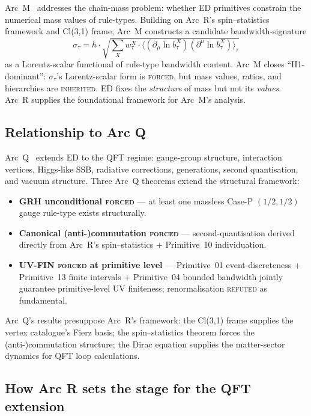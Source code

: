 \documentclass[11pt,a4paper]{article}
\begin{document}
Arc~M~\cite{arcm} addresses the chain-mass problem: whether ED primitives constrain the numerical mass values of rule-types. Building on Arc~R's spin--statistics framework and Cl(3,1) frame, Arc~M constructs a candidate bandwidth-signature
\begin{equation}
\sigma_\tau = \hbar \cdot \sqrt{\sum_X w_\tau^X \cdot \langle (\partial_\mu \ln b_\tau^X)(\partial^\mu \ln b_\tau^X) \rangle_\tau}
\end{equation}
as a Lorentz-scalar functional of rule-type bandwidth content. Arc~M closes ``H1-dominant'': $\sigma_\tau$'s Lorentz-scalar form is \textsc{forced}, but mass values, ratios, and hierarchies are \textsc{inherited}. ED fixes the \emph{structure} of mass but not its \emph{values}. Arc~R supplies the foundational framework for Arc~M's analysis.

\subsection{Relationship to Arc Q}

Arc~Q~\cite{arcq} extends ED to the QFT regime: gauge-group structure, interaction vertices, Higgs-like SSB, radiative corrections, generations, second quantisation, and vacuum structure. Three Arc~Q theorems extend the structural framework:
\begin{itemize}
  \item \textbf{GRH unconditional \textsc{forced}} --- at least one massless Case-P $(1/2, 1/2)$ gauge rule-type exists structurally.
  \item \textbf{Canonical (anti-)commutation \textsc{forced}} --- second-quantisation derived directly from Arc~R's spin--statistics + Primitive~10 individuation.
  \item \textbf{UV-FIN \textsc{forced} at primitive level} --- Primitive~01 event-discreteness + Primitive~13 finite intervals + Primitive~04 bounded bandwidth jointly guarantee primitive-level UV finiteness; renormalisation \textsc{refuted} as fundamental.
\end{itemize}
Arc~Q's results presuppose Arc~R's framework: the Cl(3,1) frame supplies the vertex catalogue's Fierz basis; the spin--statistics theorem forces the (anti-)commutation structure; the Dirac equation supplies the matter-sector dynamics for QFT loop calculations.

\subsection{How Arc R sets the stage for the QFT extension}
\end{document}
